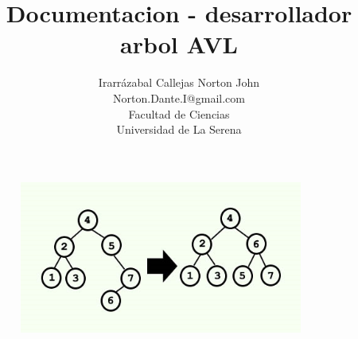 \documentclass[12pt,letterpaper]{article}
\author{Irarrázabal Callejas Norton John\\Norton.Dante.I@gmail.com\\Facultad de Ciencias\\Universidad de La Serena}
\title{Documentacion - desarrollador arbol AVL }
\date{}
\begin{document}
\maketitle
\begin{figure} [H]
\begin {center}
\includegraphics[width=10cm,height=5cm]{imagenavl} 
\end {center}
\end{figure}
\newpage
\tableofcontents
\newpage
\end{document}
